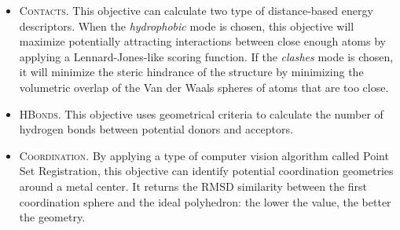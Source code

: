 \begin{itemize}
	\item \textsc{Contacts}. This objective can calculate two type of distance-based energy descriptors. When the \textit{hydrophobic} mode is chosen, this objective will maximize potentially attracting interactions between close enough atoms by applying a Lennard-Jones-like scoring function. If the \textit{clashes} mode is chosen, it will minimize the steric hindrance of the structure by minimizing the volumetric overlap of the Van der Waals spheres of atoms that are too close.

	\item \textsc{HBonds}. This objective uses geometrical criteria to calculate the number of hydrogen bonds between potential donors and acceptors.

	\item \textsc{Coordination}. By applying a type of computer vision algorithm called Point Set Registration, this objective can identify potential coordination geometries around a metal center. It returns the RMSD similarity between the first coordination sphere and the ideal polyhedron: the lower the value, the better the geometry.
\end{itemize}


